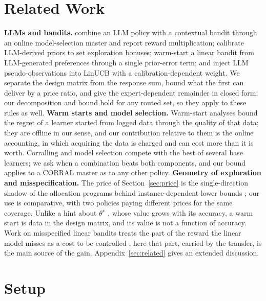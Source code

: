 \documentclass{article}
\theoremstyle{definition}
\theoremstyle{remark}
\theoremstyle{remark}
\begin{document}
\section{Related Work}
\label{sec:related-main}

\textbf{LLMs and bandits.} \cite{chen2024llmdecision} combine an LLM policy
with a contextual bandit through an online model-selection master and report
reward multiplication; \cite{huangcontextual} calibrate LLM-derived priors to
set exploration bonuses; \cite{jumpstart2026} warm-start a linear bandit from
LLM-generated preferences through a single prior-error term; and
\cite{calibgated2026} inject LLM pseudo-observations into LinUCB with a
calibration-dependent weight. We separate the design matrix from the response
sum, bound what the first can deliver by a price ratio, and give the
expert-dependent remainder in closed form; our decomposition and bound hold
for any routed set, so they apply to these rules as well.
\textbf{Warm starts and model selection.} Warm-start analyses
\cite{bastani2021mostly,zhang2019warm} bound the regret of a learner started
from logged data through the quality of that data; they are offline in our
sense, and our contribution relative to them is the online accounting, in
which acquiring the data is charged and can cost more than it is worth.
Corralling and model selection
\cite{agarwal2017corralling,pacchiano2020model,marinov2021pareto} compete
with the best of several base learners; we ask when a combination beats both
components, and our bound applies to a CORRAL master as to any other policy.
\textbf{Geometry of exploration and misspecification.} The price of
Section~\ref{sec:price} is the single-direction shadow of the allocation
programs behind instance-dependent lower bounds
\cite{graves1997asymptotically,lattimore2017end}; our use is comparative,
with two policies paying different prices for the same coverage. Unlike a
hint about $\theta^\star$ \cite{cutkosky2022leveraging}, whose value grows
with its accuracy, a warm start is data in the design matrix, and its value
is not a function of accuracy. Work on misspecified linear bandits treats the
part of the reward the linear model misses as a cost to be controlled
\cite{ghosh2017misspecified,lattimore2020learning,foster2020adapting}; here that part, carried by the transfer,
is the main source of the gain. Appendix~\ref{sec:related} gives an extended
discussion.

\section{Setup}
\label{sec:setup}
\label{sec:preliminaries}
\end{document}
